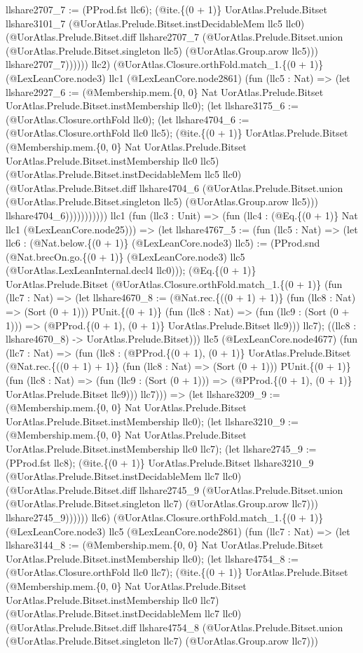 \documentclass[11pt]{article}
\begin{document}
llshare2707\_7 := (PProd.fst llc6); (@ite.\{(0 + 1)\} UorAtlas.Prelude.Bitset llshare3101\_7 (@UorAtlas.Prelude.Bitset.instDecidableMem llc5 llc0) (@UorAtlas.Prelude.Bitset.diff llshare2707\_7 (@UorAtlas.Prelude.Bitset.union (@UorAtlas.Prelude.Bitset.singleton llc5) (@UorAtlas.Group.arow llc5))) llshare2707\_7)))))) llc2) (@UorAtlas.Closure.orthFold.match\_1.\{(0 + 1)\} (@LexLeanCore.node3) llc1 (@LexLeanCore.node2861) (fun (llc5 : Nat) => (let llshare2927\_6 := (@Membership.mem.\{0, 0\} Nat UorAtlas.Prelude.Bitset UorAtlas.Prelude.Bitset.instMembership llc0); (let llshare3175\_6 := (@UorAtlas.Closure.orthFold llc0); (let llshare4704\_6 := (@UorAtlas.Closure.orthFold llc0 llc5); (@ite.\{(0 + 1)\} UorAtlas.Prelude.Bitset (@Membership.mem.\{0, 0\} Nat UorAtlas.Prelude.Bitset UorAtlas.Prelude.Bitset.instMembership llc0 llc5) (@UorAtlas.Prelude.Bitset.instDecidableMem llc5 llc0) (@UorAtlas.Prelude.Bitset.diff llshare4704\_6 (@UorAtlas.Prelude.Bitset.union (@UorAtlas.Prelude.Bitset.singleton llc5) (@UorAtlas.Group.arow llc5))) llshare4704\_6))))))))))) llc1 (fun (llc3 : Unit) => (fun (llc4 : (@Eq.\{(0 + 1)\} Nat llc1 (@LexLeanCore.node25))) => (let llshare4767\_5 := (fun (llc5 : Nat) => (let llc6 : (@Nat.below.\{(0 + 1)\} (@LexLeanCore.node3) llc5) := (PProd.snd (@Nat.brecOn.go.\{(0 + 1)\} (@LexLeanCore.node3) llc5 (@UorAtlas.LexLeanInternal.decl4 llc0))); (@Eq.\{(0 + 1)\} UorAtlas.Prelude.Bitset (@UorAtlas.Closure.orthFold.match\_1.\{(0 + 1)\} (fun (llc7 : Nat) => (let llshare4670\_8 := (@Nat.rec.\{((0 + 1) + 1)\} (fun (llc8 : Nat) => (Sort (0 + 1))) PUnit.\{(0 + 1)\} (fun (llc8 : Nat) => (fun (llc9 : (Sort (0 + 1))) => (@PProd.\{(0 + 1), (0 + 1)\} UorAtlas.Prelude.Bitset llc9))) llc7); ((llc8 : llshare4670\_8) -> UorAtlas.Prelude.Bitset))) llc5 (@LexLeanCore.node4677) (fun (llc7 : Nat) => (fun (llc8 : (@PProd.\{(0 + 1), (0 + 1)\} UorAtlas.Prelude.Bitset (@Nat.rec.\{((0 + 1) + 1)\} (fun (llc8 : Nat) => (Sort (0 + 1))) PUnit.\{(0 + 1)\} (fun (llc8 : Nat) => (fun (llc9 : (Sort (0 + 1))) => (@PProd.\{(0 + 1), (0 + 1)\} UorAtlas.Prelude.Bitset llc9))) llc7))) => (let llshare3209\_9 := (@Membership.mem.\{0, 0\} Nat UorAtlas.Prelude.Bitset UorAtlas.Prelude.Bitset.instMembership llc0); (let llshare3210\_9 := (@Membership.mem.\{0, 0\} Nat UorAtlas.Prelude.Bitset UorAtlas.Prelude.Bitset.instMembership llc0 llc7); (let llshare2745\_9 := (PProd.fst llc8); (@ite.\{(0 + 1)\} UorAtlas.Prelude.Bitset llshare3210\_9 (@UorAtlas.Prelude.Bitset.instDecidableMem llc7 llc0) (@UorAtlas.Prelude.Bitset.diff llshare2745\_9 (@UorAtlas.Prelude.Bitset.union (@UorAtlas.Prelude.Bitset.singleton llc7) (@UorAtlas.Group.arow llc7))) llshare2745\_9)))))) llc6) (@UorAtlas.Closure.orthFold.match\_1.\{(0 + 1)\} (@LexLeanCore.node3) llc5 (@LexLeanCore.node2861) (fun (llc7 : Nat) => (let llshare3144\_8 := (@Membership.mem.\{0, 0\} Nat UorAtlas.Prelude.Bitset UorAtlas.Prelude.Bitset.instMembership llc0); (let llshare4754\_8 := (@UorAtlas.Closure.orthFold llc0 llc7); (@ite.\{(0 + 1)\} UorAtlas.Prelude.Bitset (@Membership.mem.\{0, 0\} Nat UorAtlas.Prelude.Bitset UorAtlas.Prelude.Bitset.instMembership llc0 llc7) (@UorAtlas.Prelude.Bitset.instDecidableMem llc7 llc0) (@UorAtlas.Prelude.Bitset.diff llshare4754\_8 (@UorAtlas.Prelude.Bitset.union (@UorAtlas.Prelude.Bitset.singleton llc7) (@UorAtlas.Group.arow llc7))) 
\end{document}
